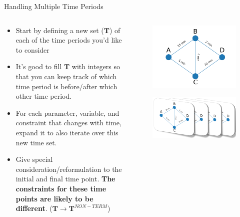 \documentclass[10pt, aspectratio=169]{beamer}
\begin{document}
\begin{frame}{Handling Multiple Time Periods}
    \begin{columns}
        \begin{column}{0.5\textwidth}
            \begin{itemize}
                \item Start by defining a new set ($\textbf{T}$) of each of the time periods you'd like to consider
                \item It's good to fill $\textbf{T}$ with integers so that you can keep track of which time period is before/after which other time period.
                \item For each parameter, variable, and constraint that changes with time, expand it to also iterate over this new time set.
                \item Give special consideration/reformulation to the initial and final time point. \textbf{The constraints for these time points are likely to be different}. ($\textbf{T} \rightarrow \textbf{T}^{NON-TERM}$)
            \end{itemize}
        \end{column}
        \begin{column}{0.5\textwidth}
            \begin{figure}
                \includegraphics[width=0.6\linewidth]{../01_Introduction/RoutePlanningProblem.png}
            \end{figure}
            \begin{figure}
                \includegraphics[width=0.7\linewidth]{RoutePlanningProblemRepeated.png}
            \end{figure}
        \end{column}
    \end{columns}
\end{frame}
\end{document}
